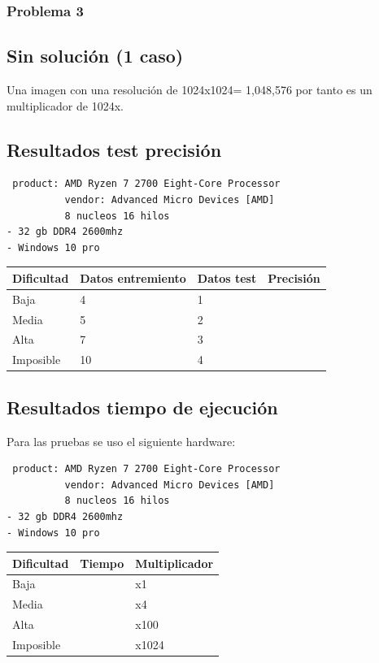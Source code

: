 \documentclass[
  spanish,
]{article}
\begin{document}
\hypertarget{problema-3-2}{%
\subsubsection{Problema 3}\label{problema-3-2}}

\hypertarget{sin-soluciuxf3n-1-caso}{%
\subsection{Sin solución (1 caso)}\label{sin-soluciuxf3n-1-caso}}

Una imagen con una resolución de 1024x1024= 1,048,576 por tanto es un
multiplicador de 1024x.

\hypertarget{resultados-test-precisiuxf3n}{%
\subsection{Resultados test
precisión}\label{resultados-test-precisiuxf3n}}

\begin{verbatim}
 product: AMD Ryzen 7 2700 Eight-Core Processor
          vendor: Advanced Micro Devices [AMD]
          8 nucleos 16 hilos
- 32 gb DDR4 2600mhz
- Windows 10 pro
\end{verbatim}

\begin{longtable}[]{@{}llll@{}}
\toprule
Dificultad & Datos entremiento & Datos test & Precisión\tabularnewline
\midrule
\endhead
Baja & 4 & 1 &\tabularnewline
Media & 5 & 2 &\tabularnewline
Alta & 7 & 3 &\tabularnewline
Imposible & 10 & 4 &\tabularnewline
\bottomrule
\end{longtable}

\hypertarget{resultados-tiempo-de-ejecuciuxf3n}{%
\subsection{Resultados tiempo de
ejecución}\label{resultados-tiempo-de-ejecuciuxf3n}}

Para las pruebas se uso el siguiente hardware:

\begin{verbatim}
 product: AMD Ryzen 7 2700 Eight-Core Processor
          vendor: Advanced Micro Devices [AMD]
          8 nucleos 16 hilos
- 32 gb DDR4 2600mhz
- Windows 10 pro
\end{verbatim}

\begin{longtable}[]{@{}lll@{}}
\toprule
Dificultad & Tiempo & Multiplicador\tabularnewline
\midrule
\endhead
Baja & & x1\tabularnewline
Media & & x4\tabularnewline
Alta & & x100\tabularnewline
Imposible & & x1024\tabularnewline
\bottomrule
\end{longtable}
\end{document}
